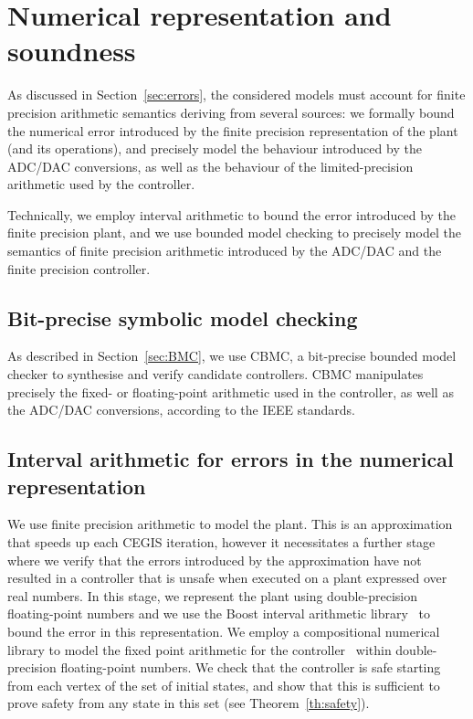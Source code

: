 \section{Numerical representation and soundness} 
\label{sec:numeric_rep}

As discussed in Section~\ref{sec:errors}, 
the considered models must account for finite precision arithmetic semantics deriving from several sources: 
we formally bound the numerical error introduced by the finite precision representation of the plant (and its operations), 
and precisely model the behaviour introduced by the ADC/DAC conversions, 
as well as the behaviour of the limited-precision arithmetic used by the controller. 

Technically, we employ interval arithmetic to bound the error introduced by the finite precision plant, 
and we use bounded model checking to precisely model the semantics of finite precision arithmetic introduced by the ADC/DAC and the finite precision controller.

\subsection{Bit-precise symbolic model checking}
As described in Section~\ref{sec:BMC}, we use CBMC, a bit-precise bounded model checker to synthesise and verify candidate controllers. 
CBMC manipulates precisely the fixed- or floating-point arithmetic used in the controller, 
as well as the ADC/DAC conversions, 
according to the IEEE standards. 

\subsection{Interval arithmetic for errors in the numerical representation} 

We use finite precision arithmetic to model the plant. 
This is an approximation that speeds up each CEGIS iteration, 
however it necessitates a further stage where we verify that the errors introduced by the approximation have not resulted in a controller that is unsafe when executed on a plant expressed over real numbers.  
In this stage, we represent the plant using double-precision floating-point numbers 
and we use the Boost interval arithmetic library~\cite{DBLP:journals/tcs/BronnimannMP06} to bound the error in this representation. 
We employ a compositional numerical library to model the fixed point arithmetic for the controller~\cite{CNL} within double-precision floating-point numbers. 
We check that the controller is safe starting from each vertex of the set of initial states,  
and show that this is sufficient to prove safety from any state in this set (see Theorem~\ref{th:safety}). %

